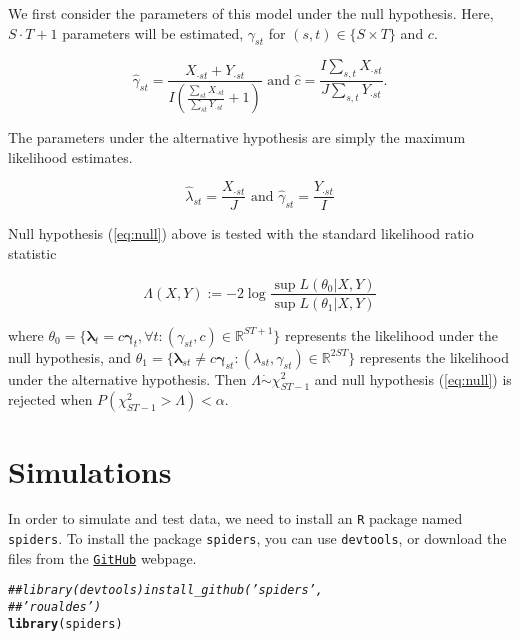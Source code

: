 \documentclass[12pt]{article}\usepackage[]{graphicx}\usepackage[]{color}
\makeatletter
\newcommand{\hlcom}[1]{\textcolor[rgb]{0.678,0.584,0.686}{\textit{#1}}}%
\newcommand{\hlstd}[1]{\textcolor[rgb]{0.345,0.345,0.345}{#1}}%
\newcommand{\hlkwd}[1]{\textcolor[rgb]{0.737,0.353,0.396}{\textbf{#1}}}%
\newenvironment{kframe}{%
 \def\at@end@of@kframe{}%
 \ifinner\ifhmode%
  \def\at@end@of@kframe{\end{minipage}}%
  \begin{minipage}{\columnwidth}%
 \fi\fi%
 \def\FrameCommand##1{\hskip\@totalleftmargin \hskip-\fboxsep
 \colorbox{shadecolor}{##1}\hskip-\fboxsep
     \hskip-\linewidth \hskip-\@totalleftmargin \hskip\columnwidth}%
 \MakeFramed {\advance\hsize-\width
   \@totalleftmargin\z@ \linewidth\hsize
   \@setminipage}}%
 {\par\unskip\endMakeFramed%
 \at@end@of@kframe}
\newenvironment{knitrout}{}{} %
\makeatother
\begin{document}
We first consider the parameters of this model under the null hypothesis.  Here, $S\cdot T + 1$ parameters will be estimated, $\gamma_{st}$ for $(s,t) \in \{S \times T\}$ and $c$. 

\begin{equation*}
  \hat{\gamma}_{st} = \frac{X_{\cdot st} + Y_{\cdot st}}{I\left(\frac{\sum_{st} X_{\cdot st}}{\sum_{st}Y_{\cdot st}} +1 \right)} \text{ and } \hat{c} = \frac{I\sum_{s,t} X_{\cdot st}}{J\sum_{s,t} Y_{\cdot st}}.
\end{equation*}

The parameters under the alternative hypothesis are simply the maximum likelihood estimates.

\begin{equation*}
  \hat{\lambda}_{st} = \frac{X_{\cdot st}}{J} \text{ and } \hat{\gamma}_{st} = \frac{Y_{\cdot st}}{I}
\end{equation*}

Null hypothesis (\ref{eq:null}) above is tested with the standard likelihood ratio statistic

\begin{equation}
  \label{eq:lrt}
  \Lambda(X,Y) := -2 \log{ \frac{ \sup L(\theta_0|X,Y)}{ \sup L(\theta_1|X,Y)} }
\end{equation}

where $\theta_0 = \{ \boldsymbol{\lambda}_t = c \boldsymbol{\gamma}_t, \forall t : (\gamma_{st}, c) \in \mathbb{R}^{ST+1} \}$ represents the likelihood under the null hypothesis, and $\theta_1 = \{ \boldsymbol{\lambda}_{st} \ne c \boldsymbol{\gamma}_{st} : (\lambda_{st}, \gamma_{st}) \in \mathbb{R}^{2ST} \}$ represents the likelihood under the alternative hypothesis.  Then $\Lambda \dot{\sim} \chi^2_{ST-1}$ and null hypothesis (\ref{eq:null}) is rejected when $P(\chi^2_{ST-1} > \Lambda) < \alpha$. 

\section*{Simulations}

In order to simulate and test data, we need to install an \texttt{R} package named \texttt{spiders}.  To install the package \texttt{spiders}, you can use \texttt{devtools}, or download the files from the \href{https://github.com/roualdes/spiders}{\texttt{GitHub}} webpage.

\begin{knitrout}
\color{fgcolor}\begin{kframe}
\begin{alltt}
\hlcom{## library(devtools) install_github('spiders',}
\hlcom{## 'roualdes')}
\hlkwd{library}\hlstd{(spiders)}
\end{alltt}
\end{kframe}
\end{knitrout}
\end{document}
